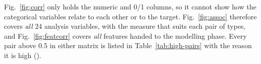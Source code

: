 Fig.~\ref{fig:corr} only holds the numeric and 0/1 columns, so it cannot show how the categorical variables relate to each other or to the target. Fig.~\ref{fig:assoc} therefore covers \emph{all} 24 analysis variables, with the measure that suits each pair of types, and Fig.~\ref{fig:featcorr} covers \emph{all} \nFeatures features handed to the modelling phase. Every pair above 0.5 in either matrix is listed in Table~\ref{tab:high-pairs} with the reason it is high ().

\begin{table}[htbp]
\centering\footnotesize
\caption{Every pair of variables (Fig.~\ref{fig:assoc}) or features (Fig.~\ref{fig:featcorr}) with an association above 0.5.}\label{tab:high-pairs}

\end{table}

